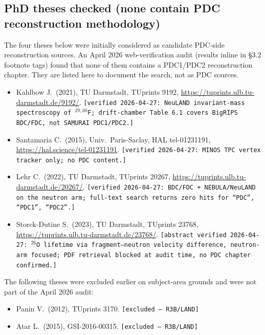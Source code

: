 \documentclass[a4paper, 11pt]{article}
\begin{document}
\subsection{PhD theses checked (none contain PDC reconstruction methodology)}
The four theses below were initially considered as candidate PDC-side reconstruction sources. An April 2026 web-verification audit (results inline in §3.2 footnote tags) found that none of them contains a PDC1/PDC2 reconstruction chapter. They are listed here to document the search, not as PDC sources.
\begin{itemize}
  \item Kahlbow J.\ (2021), TU Darmstadt, TUprints 9192, \url{https://tuprints.ulb.tu-darmstadt.de/9192/}. \texttt{[verified 2026-04-27: NeuLAND invariant-mass spectroscopy of $^{29,30}$F; drift-chamber Table~6.1 covers BigRIPS BDC/FDC, not SAMURAI PDC1/PDC2.]}
  \item Santamaria C.\ (2015), Univ.\ Paris-Saclay, HAL tel-01231191, \url{https://hal.science/tel-01231191}. \texttt{[verified 2026-04-27: MINOS TPC vertex tracker only; no PDC content.]}
  \item Lehr C.\ (2022), TU Darmstadt, TUprints 20267, \url{https://tuprints.ulb.tu-darmstadt.de/20267/}. \texttt{[verified 2026-04-27: BDC/FDC + NEBULA/NeuLAND on the neutron arm; full-text search returns zero hits for ``PDC'', ``PDC1'', ``PDC2''.]}
  \item Storck-Dutine S.\ (2023), TU Darmstadt, TUprints 23768, \url{https://tuprints.ulb.tu-darmstadt.de/23768/}. \texttt{[abstract verified 2026-04-27: $^{26}$O lifetime via fragment--neutron velocity difference, neutron-arm focused; PDF retrieval blocked at audit time, no PDC chapter confirmed.]}
\end{itemize}
The following theses were excluded earlier on subject-area grounds and were not part of the April 2026 audit:
\begin{itemize}
  \item Panin V.\ (2012), TUprints 3170. \texttt{[excluded --- R3B/LAND]}
  \item Atar L.\ (2015), GSI-2016-00315. \texttt{[excluded --- R3B/LAND]}
\end{itemize}
\end{document}
